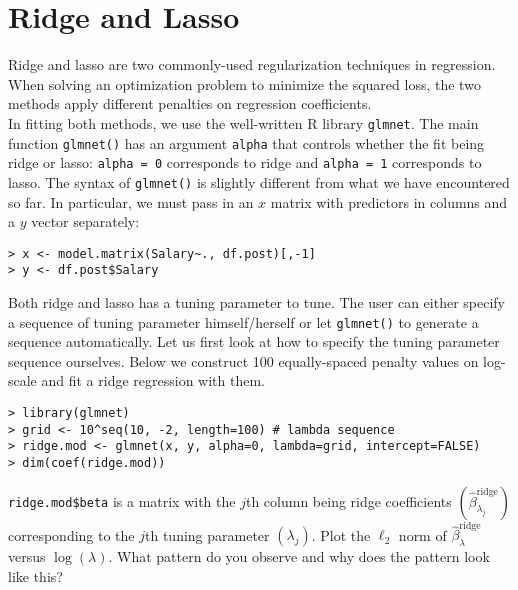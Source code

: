 \documentclass{article}
\begin{document}
\section{Ridge and Lasso}

Ridge and lasso are two commonly-used regularization techniques in regression. When solving an optimization problem to minimize the squared loss, the two methods apply different penalties on regression coefficients. \\

In fitting both methods, we use the well-written R library \texttt{glmnet}.
The main function \texttt{glmnet()} has an argument \texttt{alpha} that
controls whether the fit being ridge or lasso: \texttt{alpha = 0} corresponds
to ridge and \texttt{alpha = 1} corresponds to lasso. The syntax of
\texttt{glmnet()} is slightly different from what we have encountered so far.
In particular, we must pass in an $x$ matrix with predictors in columns and a
$y$ vector separately:

\begin{Verbatim}[frame=single]
> x <- model.matrix(Salary~., df.post)[,-1]
> y <- df.post$Salary
\end{Verbatim}

Both ridge and lasso has a tuning parameter to tune. The user can either
specify a sequence of tuning parameter himself/herself or let \texttt{glmnet()}
to generate a sequence automatically. Let us first look at how to specify the
tuning parameter sequence ourselves. Below we construct 100 equally-spaced
penalty values on log-scale and fit a ridge regression with them.

\begin{Verbatim}[frame=single]
> library(glmnet)
> grid <- 10^seq(10, -2, length=100) # lambda sequence
> ridge.mod <- glmnet(x, y, alpha=0, lambda=grid, intercept=FALSE)
> dim(coef(ridge.mod))
\end{Verbatim}


\texttt{ridge.mod\$beta} is a matrix with the $j$th column being ridge
coefficients $(\hat\beta^{\textrm{ridge}}_{\lambda_j})$ corresponding to the
$j$th
tuning parameter $(\lambda_j)$. Plot the $\ell_2$ norm of
$\hat\beta^{\textrm{ridge}}_\lambda$ versus $\log(\lambda)$. What pattern do
you observe and why does the pattern look like this?

\begin{Verbatim}[frame=single]




















\end{Verbatim}
\end{document}
